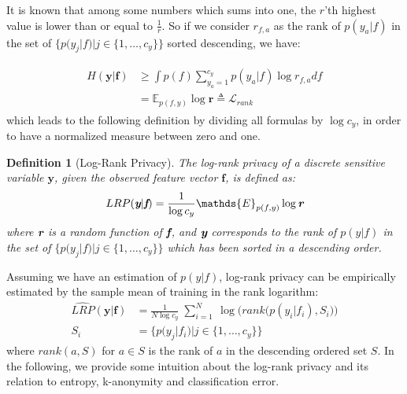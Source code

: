 \documentclass[10pt,journal,compsoc]{IEEEtran}
\newtheorem{definition}[theorem]{Definition}
\begin{document}
It is known that among some numbers which sums into one, the $r$'th highest value is lower than or equal to $\frac{1}{r}$. So if we consider $r_{f,a}$ as the rank of $p(y_a|f)$ in the set of $\big\{p(y_j|f) | j \in \{1,\ldots,c_y\}\big\}$ sorted descending, we have:

\begin{align}
\begin{split}
 H(\textbf{y}|\textbf{f}) & \geq \int p(f) \sum_{y_a=1}^{c_y} p(y_a|f) \log r_{f,a} df \\
& = \mathds{E}_{p(f,y)} \log \textbf{r} \triangleq \mathcal{L}_{rank}
\end{split}
\end{align}
which leads to the following definition by dividing all formulas by $\log c_y$, in order to have a normalized measure between zero and one.

\begin{definition}[Log-Rank Privacy]
The \emph{log-rank privacy} of a discrete sensitive variable $\textbf{y}$, given the observed feature vector $\textbf{f}$, is defined as:
\begin{align}
LRP(\emph{\textbf{y}}|\emph{\textbf{f}}) = \frac{1}{\log c_y} \mathds{E}_{p(f,y)} \log \emph{\textbf{r}}
\end{align}
where $\emph{\textbf{r}}$ is a random function of $\emph{\textbf{f}}$, and $\emph{\textbf{y}}$ corresponds to the rank of $p(y|f)$ in the set of $\big\{p(y_j|f) | j \in \{1,\ldots,c_y\}\big\}$ which has been sorted in a descending order.
\end{definition}Assuming we have an estimation of $p(y|f)$, log-rank privacy can be empirically estimated by the sample mean of training in the rank logarithm:
\begin{align*}
\hat{LRP}(\textbf{y}|\textbf{f}) &= \frac{1}{N \log c_y}\; \sum_{i=1}^N \ \log\Big(rank\big(p(y_i|f_i), S_i\big)\Big) \\
S_i &= \big\{p(y_j|f_i) | j \in \{1,\ldots,c_y\}\big\}
\end{align*}
where $rank(a,S)$ for $a \in S$ is the rank of $a$ in the descending ordered set $S$. In the following, we provide some intuition about the log-rank privacy and its relation to entropy, k-anonymity and classification error.\\
\end{document}
